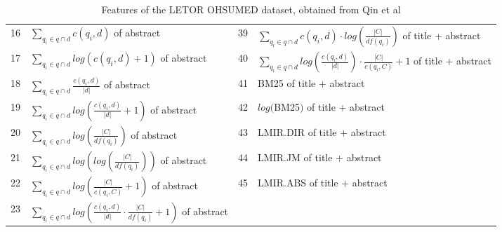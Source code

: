 \begin{table}[!htp]
{\begin{tabular}{p{0.29cm}|p{6.88cm}||p{0.29cm}|p{6cm}}
16& $\sum\nolimits_{q_i \in q \cap d}c(q_i, d)$ of abstract		& 39& $\sum\nolimits_{q_i \in q \cap d}c(q_i,d)\cdot log(\frac{|C|}{df(q_i)})$ of title + abstract\\
17& $\sum\nolimits_{q_i \in q \cap d}log(c(q_i, d)+1)$ of abstract		& 40& $\sum\nolimits_{q_i \in q \cap d} log(\frac{c(q_i,d)}{|d|}) \cdot \frac{|C|}{c(q_i,C)}+1$ of title + abstract\\
18& $\sum\nolimits_{q_i \in q \cap d}\frac{c(q_i,d)}{|d|}$ of abstract		& 41& BM25 of title + abstract\\
19& $\sum\nolimits_{q_i \in q \cap d}log(\frac{c(q_i,d)}{|d|}+1)$ of abstract		& 42& $log($BM25$)$ of title + abstract\\
20& $\sum\nolimits_{q_i \in q \cap d}log(\frac{|C|}{df(q_i)})$ of abstract	& 43& LMIR.DIR of title + abstract\\

21& $\sum\nolimits_{q_i \in q \cap d}log(log(\frac{|C|}{df(q_i)}))$ of abstract					& 44& LMIR.JM of title + abstract\\
22&  $\sum\nolimits_{q_i \in q \cap d}log(\frac{|C|}{c(q_i,C)}+1)$ of abstract					& 45& LMIR.ABS of title + abstract\\
23& $\sum\nolimits_{q_i \in q \cap d}log(\frac{c(q_i,d)}{|d|} \cdot \frac{|C|}{df(q_i)}+1)$ of abstract					& & \\
\end{tabular}
}
\caption{Features of the LETOR OHSUMED dataset, obtained from Qin et al \cite{Qin2010}}
\label{tbl:features_ohsumed}
\end{table}

